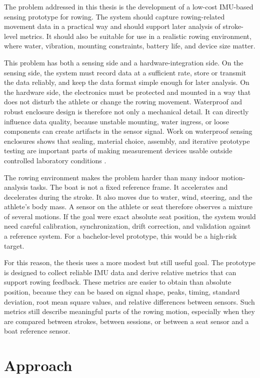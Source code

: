 The problem addressed in this thesis is the development of a low-cost IMU-based sensing prototype for rowing. The system should capture rowing-related movement data in a practical way and should support later analysis of stroke-level metrics. It should also be suitable for use in a realistic rowing environment, where water, vibration, mounting constraints, battery life, and device size matter.

This problem has both a sensing side and a hardware-integration side. On the sensing side, the system must record data at a sufficient rate, store or transmit the data reliably, and keep the data format simple enough for later analysis. On the hardware side, the electronics must be protected and mounted in a way that does not disturb the athlete or change the rowing movement. Waterproof and robust enclosure design is therefore not only a mechanical detail. It can directly influence data quality, because unstable mounting, water ingress, or loose components can create artifacts in the sensor signal. Work on waterproof sensing enclosures shows that sealing, material choice, assembly, and iterative prototype testing are important parts of making measurement devices usable outside controlled laboratory conditions \cite{lindqvist_design_2015,huayna_fernandez_enclosure_2025}.

The rowing environment makes the problem harder than many indoor motion-analysis tasks. The boat is not a fixed reference frame. It accelerates and decelerates during the stroke. It also moves due to water, wind, steering, and the athlete's body mass. A sensor on the athlete or seat therefore observes a mixture of several motions. If the goal were exact absolute seat position, the system would need careful calibration, synchronization, drift correction, and validation against a reference system. For a bachelor-level prototype, this would be a high-risk target.

For this reason, the thesis uses a more modest but still useful goal. The prototype is designed to collect reliable IMU data and derive relative metrics that can support rowing feedback. These metrics are easier to obtain than absolute position, because they can be based on signal shape, peaks, timing, standard deviation, root mean square values, and relative differences between sensors. Such metrics still describe meaningful parts of the rowing motion, especially when they are compared between strokes, between sessions, or between a seat sensor and a boat reference sensor.

\section{Approach}

